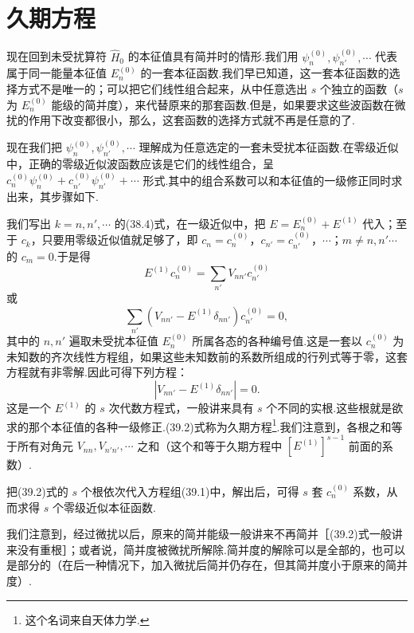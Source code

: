 \section{久期方程}

现在回到未受扰算符 $\hat{H}_0$ 的本征值具有简并时的情形.我们用 $\psi_n^{(0)},\psi_{n'}^{(0)},\cdots$ 代表属于同一能量本征值 $E_n^{(0)}$ 的一套本征函数.我们早已知道，这一套本征函数的选择方式不是唯一的；可以把它们线性组合起来，从中任意选出 $s$ 个独立的函数（$s$ 为 $E_n^{(0)}$ 能级的简并度），来代替原来的那套函数.但是，如果要求这些波函数在微扰的作用下改变都很小，那么，这套函数的选择方式就不再是任意的了.

现在我们把 $\psi_n^{(0)},\psi_{n'}^{(0)},\cdots$ 理解成为任意选定的一套未受扰本征函数.在零级近似中，正确的零级近似波函数应该是它们的线性组合，呈 $c_n^{(0)}\psi_n^{(0)}+c_{n'}^{(0)}\psi_{n'}^{(0)}+\cdots$ 形式.其中的组合系数可以和本征值的一级修正同时求出来，其步骤如下.

我们写出 $k=n,n',\cdots$ 的(38.4)式，在一级近似中，把 $E=E_n^{(0)}+E^{(1)}$ 代入；至于 $c_k$，只要用零级近似值就足够了，即 $c_n=c_n^{(0)}$，$c_{n'}=c_{n'}^{(0)}$，$\cdots$；$m\neq n,n'\cdots$ 的 $c_m=0$.于是得
\begin{equation*}
  E^{(1)}c_n^{(0)}=\sum_{n'}V_{nn'}c_{n'}^{(0)}
\end{equation*}
或
\begin{equation}
  \sum_{n'}\left(V_{nn'}-E^{(1)}\delta_{nn'}\right)c_{n'}^{(0)}=0,
\end{equation}
其中的 $n,n'$ 遍取未受扰本征值 $E_n^{(0)}$ 所属各态的各种编号值.这是一套以 $c_n^{(0)}$ 为未知数的齐次线性方程组，如果这些未知数前的系数所组成的行列式等于零，这套方程就有非零解.因此可得下列方程：
\begin{equation}
  \left|V_{nn'}-E^{(1)}\delta_{nn'}\right|=0.
\end{equation}
这是一个 $E^{(1)}$ 的 $s$ 次代数方程式，一般讲来具有 $s$ 个不同的实根.这些根就是欲求的那个本征值的各种一级修正.(39.2)式称为久期方程\footnote{这个名词来自天体力学.}.我们注意到，各根之和等于所有对角元 $V_{nn},V_{n'n'},\cdots$ 之和（这个和等于久期方程中 $\left[E^{(1)}\right]^{s-1}$ 前面的系数）.

把(39.2)式的 $s$ 个根依次代入方程组(39.1)中，解出后，可得 $s$ 套 $c_n^{(0)}$ 系数，从而求得 $s$ 个零级近似本征函数.

我们注意到，经过微扰以后，原来的简并能级一般讲来不再简并［(39.2)式一般讲来没有重根］；或者说，简并度被微扰所解除.简并度的解除可以是全部的，也可以是部分的（在后一种情况下，加入微扰后简并仍存在，但其简并度小于原来的简并度）.

